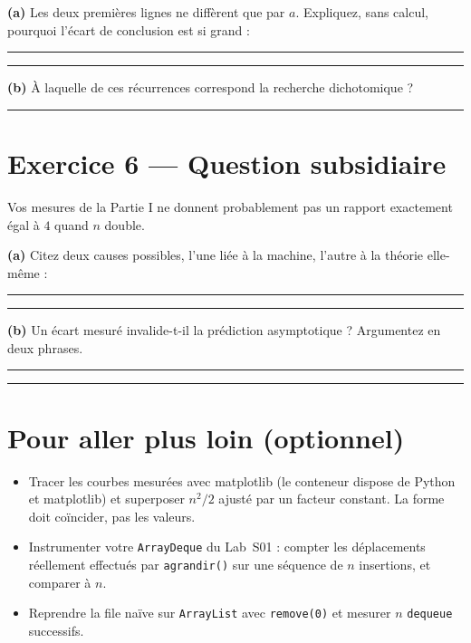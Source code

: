 \documentclass[11pt,a4paper]{article}
\newcommand{\lig}[1]{\rule{#1}{0.4pt}}
\begin{document}
\vspace{0.3cm}
\noindent\textbf{(a)} Les deux premières lignes ne diffèrent que par $a$.
Expliquez, sans calcul, pourquoi l'écart de conclusion est si grand :
\lig{9cm}

\vspace{0.2cm}
\noindent\lig{14cm}

\vspace{0.3cm}
\noindent\textbf{(b)} À laquelle de ces récurrences correspond la recherche
dichotomique ? \lig{5cm}

\section{Exercice 6 --- Question subsidiaire}

Vos mesures de la Partie I ne donnent probablement pas un rapport exactement
égal à $4$ quand $n$ double.

\vspace{0.2cm}
\noindent\textbf{(a)} Citez deux causes possibles, l'une liée à la machine,
l'autre à la théorie elle-même : \lig{9cm}

\vspace{0.2cm}
\noindent\lig{14cm}

\vspace{0.3cm}
\noindent\textbf{(b)} Un écart mesuré invalide-t-il la prédiction
asymptotique ? Argumentez en deux phrases. \lig{9cm}

\vspace{0.2cm}
\noindent\lig{14cm}

\newpage
\section*{Pour aller plus loin (optionnel)}

\begin{itemize}[nosep]
    \item Tracer les courbes mesurées avec matplotlib (le conteneur dispose
          de Python et matplotlib) et superposer $n^2/2$ ajusté par un
          facteur constant. La forme doit coïncider, pas les valeurs.
    \item Instrumenter votre \texttt{ArrayDeque} du Lab~S01 : compter les
          déplacements réellement effectués par \texttt{agrandir()} sur une
          séquence de $n$ insertions, et comparer à $n$.
    \item Reprendre la file naïve sur \texttt{ArrayList} avec
          \texttt{remove(0)} et mesurer $n$ \texttt{dequeue} successifs.
\end{itemize}
\end{document}
